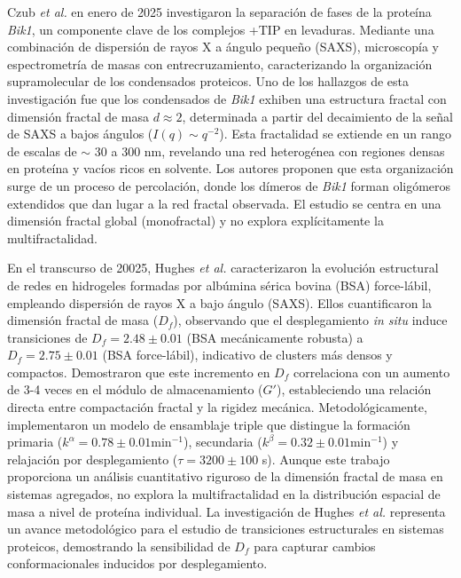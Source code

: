 Czub \textit{et al.} en enero de 2025 \cite{Czub2025} investigaron la separación de fases de la proteína \textit{Bik1}, un componente clave de los complejos +TIP en levaduras. Mediante una combinación de dispersión de rayos X a ángulo pequeño (SAXS), microscopía y espectrometría de masas con entrecruzamiento, caracterizando la organización supramolecular de los condensados proteicos. Uno de los hallazgos de esta investigación fue que los condensados de \textit{Bik1} exhiben una estructura fractal con dimensión fractal de masa $d \approx 2$, determinada a partir del decaimiento de la señal de SAXS a bajos ángulos ($I(q) \sim q^{-2}$). Esta fractalidad se extiende en un rango de escalas de $\sim$ 30 a 300 nm, revelando una red heterogénea con regiones densas en proteína y vacíos ricos en solvente. Los autores proponen que esta organización surge de un proceso de percolación, donde los dímeros de \textit{Bik1} forman oligómeros extendidos que dan lugar a la red fractal observada. El estudio se centra en una dimensión fractal global (monofractal) y no explora explícitamente la multifractalidad.

En el transcurso de 20025, Hughes \textit{et al.} \cite{Hughes2025} caracterizaron la evolución estructural de redes en hidrogeles formadas por albúmina sérica bovina (BSA) force-lábil, empleando dispersión de rayos X a bajo ángulo (SAXS). Ellos cuantificaron la dimensión fractal de masa ($D_f$), observando que el desplegamiento \textit{in situ} induce transiciones de $D_f = 2.48 \pm 0.01$ (BSA mecánicamente robusta) a $D_f = 2.75 \pm 0.01$ (BSA force-lábil), indicativo de clusters más densos y compactos. Demostraron que este incremento en $D_f$ correlaciona con un aumento de 3-4 veces en el módulo de almacenamiento ($G'$), estableciendo una relación directa entre compactación fractal y la rigidez mecánica. Metodológicamente, implementaron un modelo de ensamblaje triple que distingue la formación primaria ($k^\alpha = 0.78 \pm 0.01 $min$^{-1}$), secundaria ($k^\beta = 0.32 \pm 0.01 $min$^{-1}$) y relajación por desplegamiento ($\tau = 3200 \pm 100$ s). Aunque este trabajo proporciona un análisis cuantitativo riguroso de la dimensión fractal de masa en sistemas agregados, no explora la multifractalidad en la distribución espacial de masa a nivel de proteína individual. La investigación de Hughes \textit{et al.} representa un avance metodológico para el estudio de transiciones estructurales en sistemas proteicos, demostrando la sensibilidad de $D_f$ para capturar cambios conformacionales inducidos por desplegamiento.

